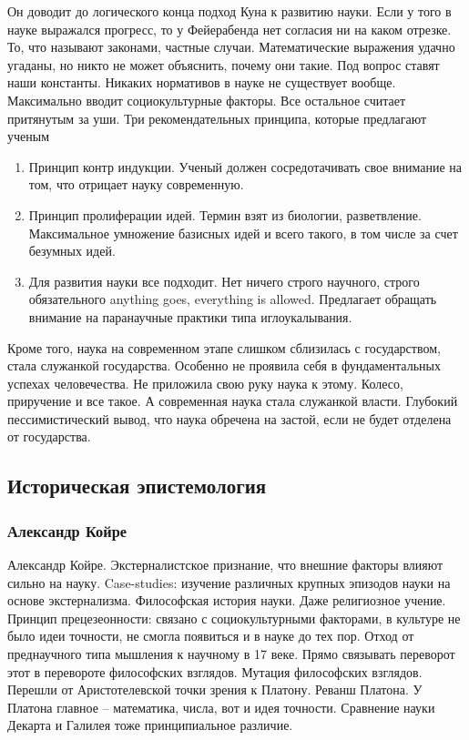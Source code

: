 \documentclass[a4paper, 12pt]{article}
\begin{document}
Он доводит до логического конца подход Куна к развитию науки. Если 
у того в науке выражался прогресс, то у Фейерабенда нет согласия ни на 
каком отрезке. То, что называют законами, частные случаи. Математические 
выражения удачно угаданы, но никто не может объяснить, почему они такие. 
Под вопрос ставят наши константы. Никаких нормативов в науке не 
существует вообще. Максимально вводит социокультурные факторы. Все 
остальное считает притянутым за уши. Три рекомендательных принципа, 
которые предлагают ученым
\begin{enumerate}
  \item Принцип контр индукции. Ученый должен сосредотачивать свое 
    внимание на том, что отрицает науку современную.
  \item Принцип пролиферации идей. Термин взят из биологии, 
    разветвление. Максимальное умножение базисных идей и всего такого, 
    в том числе за счет безумных идей.
  \item Для развития науки все подходит. Нет ничего строго научного, 
    строго обязательного anything goes, everything is allowed. 
    Предлагает обращать внимание на паранаучные практики типа 
    иглоукалывания.
\end{enumerate}
Кроме того, наука на современном этапе слишком сблизилась 
с государством, стала служанкой государства. Особенно не проявила себя 
в фундаментальных успехах человечества. Не приложила свою руку наука 
к этому. Колесо, приручение и все такое. А современная наука стала 
служанкой власти. Глубокий пессимистический вывод, что наука обречена на 
застой, если не будет отделена от государства.


\subsection{Историческая эпистемология}

\subsubsection{Александр Койре}

Александр Койре. Экстерналистское признание, что внешние факторы влияют 
сильно на науку. Case-studies: изучение различных крупных эпизодов науки 
на основе экстернализма. Философская история науки. Даже религиозное 
учение. Принцип прецезеонности: связано с социокультурными факторами, 
в культуре не было идеи точности, не смогла появиться и в науке до тех 
пор. Отход от преднаучного типа мышления к научному в 17 веке. Прямо 
связывать переворот этот в перевороте философских взглядов. Мутация 
философских взглядов. Перешли от Аристотелевской точки зрения к Платону. 
Реванш Платона. У Платона главное -- математика, числа, вот и идея 
точности. Сравнение науки Декарта и Галилея тоже принципиальное 
различие.
\end{document}
